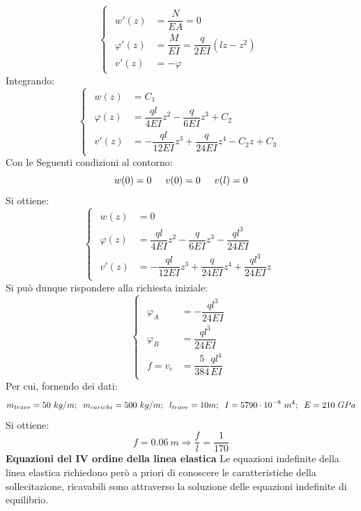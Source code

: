 \documentclass{article}
\begin{document}
\begin{adjustwidth}{2in}{}
		\[
		\begin{cases}
			\begin{aligned}
				w'(z)& = \dfrac{N}{EA} = 0 \\
				\varphi'(z)& = \dfrac{M}{EI} = \dfrac{q}{2EI}(lz -z^2) \\
				v'(z)& = -\varphi 				
			\end{aligned}
		\end{cases}
		\]
		Integrando: 
		\[
		\begin{cases}
			\begin{aligned}
				w(z)& = C_1 \\
				\varphi(z)& = \dfrac{ql}{4EI}z^2 - \dfrac{q}{6EI}z^3 + C_2 \\
				v'(z)& = -\dfrac{ql}{12EI}z^3 + \dfrac{q}{24EI}z^4 - C_2z +C_3				
			\end{aligned}
		\end{cases}
		\]
		Con le Seguenti condizioni al contorno: 
		\[ w(0) = 0 \hspace{0.5cm} v(0) = 0 \hspace{0.5cm} v(l) = 0\]
		Si ottiene:
		\[
		\begin{cases}
			\begin{aligned}
				w(z)& = 0 \\
				\varphi(z)& = \dfrac{ql}{4EI}z^2 - \dfrac{q}{6EI}z^3 - \dfrac{ql^3}{24EI} \\
				v'(z)& = -\dfrac{ql}{12EI}z^3 + \dfrac{q}{24EI}z^4 + \dfrac{ql^3}{24EI}z 			
			\end{aligned}
		\end{cases}
		\]
		Si può dunque rispondere alla richiesta iniziale: 
		\[
		\begin{cases}
			\begin{aligned}
				\varphi_A & = - \dfrac{ql^3}{24EI} \\
				\varphi_B & =  \dfrac{ql^3}{24EI} \\
				f = v_c & = \dfrac{5}{384}	\dfrac{ql^4}{EI}			
			\end{aligned}
		\end{cases}
		\]
		Per cui, fornendo dei dati: 
		\[ m_{trave} = 50 ~ kg/m; \hspace{0.2cm} m_{carichi} = 500 ~ kg/m; \hspace{0.2cm} l_{trave} = 10m; \hspace{0.2cm} I = 5790 \cdot 10^{-8} ~ m^4; \hspace{0.2cm} E = 210 ~ GPa \]
		Si ottiene:
		\[ f = 0.06 ~ m \Rightarrow \dfrac{f}{l} = \dfrac{1}{170}\]
\newpage		
{\Large \textbf{Equazioni del IV ordine della linea elastica}} \mbox{} \newline
		Le equazioni indefinite della linea elastica richiedono però a priori di conoscere le caratteristiche della sollecitazione, ricavabili sono attraverso la soluzione delle equazioni indefinite di equilibrio.\newline 
		

\end{adjustwidth}
\end{document}

